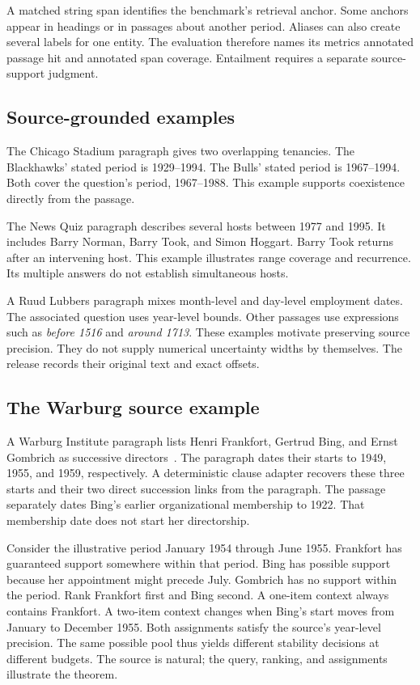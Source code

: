 A matched string span identifies the benchmark's retrieval anchor.
Some anchors appear in headings or in passages about another period.
Aliases can also create several labels for one entity.
The evaluation therefore names its metrics annotated passage hit and annotated span coverage.
Entailment requires a separate source-support judgment.

\subsection{Source-grounded examples}
The Chicago Stadium paragraph gives two overlapping tenancies.
The Blackhawks' stated period is 1929--1994.
The Bulls' stated period is 1967--1994.
Both cover the question's period, 1967--1988.
This example supports coexistence directly from the passage.

The News Quiz paragraph describes several hosts between 1977 and 1995.
It includes Barry Norman, Barry Took, and Simon Hoggart.
Barry Took returns after an intervening host.
This example illustrates range coverage and recurrence.
Its multiple answers do not establish simultaneous hosts.

A Ruud Lubbers paragraph mixes month-level and day-level employment dates.
The associated question uses year-level bounds.
Other passages use expressions such as \emph{before 1516} and \emph{around 1713}.
These examples motivate preserving source precision.
They do not supply numerical uncertainty widths by themselves.
The release records their original text and exact offsets.

\subsection{The Warburg source example}


A Warburg Institute paragraph lists Henri Frankfort, Gertrud Bing, and Ernst Gombrich as successive directors~\citep{chen2021timeqa}.
The paragraph dates their starts to 1949, 1955, and 1959, respectively.
A deterministic clause adapter recovers these three starts and their two direct succession links from the paragraph.
The passage separately dates Bing's earlier organizational membership to 1922.
That membership date does not start her directorship.

Consider the illustrative period January 1954 through June 1955.
Frankfort has guaranteed support somewhere within that period.
Bing has possible support because her appointment might precede July.
Gombrich has no support within the period.
Rank Frankfort first and Bing second.
A one-item context always contains Frankfort.
A two-item context changes when Bing's start moves from January to December 1955.
Both assignments satisfy the source's year-level precision.
The same possible pool thus yields different stability decisions at different budgets.
The source is natural; the query, ranking, and assignments illustrate the theorem.

